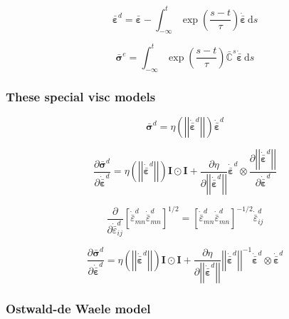 \documentclass[12pt]{article}
\renewcommand{\d}{\text{d}}
\newcommand{\pder}[2]{\dfrac{\partial #1}{\partial #2}}
\begin{document}
\begin{equation}
\bar{\bm{\varepsilon}}^{d} = \bar{\bm{\varepsilon}} - \int_{-\infty}^{t} \exp\left(\dfrac{s-t}{\tau}\right)\dot{\bar{\bm{\varepsilon}}} \,\d s
\end{equation}

\begin{equation}
\bar{\bm{\sigma}}^{e} = \int_{-\infty}^{t} \exp\left(\dfrac{s-t}{\tau}\right)\bar{\mathbb{C}}^{s}\dot{\bar{\bm{\varepsilon}}} \,\d s
\end{equation}

\subsubsection{These special visc models}

\begin{equation}
	\bar{\bm{\sigma}}^{d} = \eta\left(\left|\left|\dot{\bar{\bm{\varepsilon}}}^{d}\right| \right|\right)\dot{\bar{\bm{\varepsilon}}}^{d}
\end{equation}

\begin{equation}
	\pder{\bar{\bm{\sigma}}^{d}}{\dot{\bar{\bm{\varepsilon}}}^{d}}= \eta\left(\left|\left|\dot{\bar{\bm{\varepsilon}}}^{d}\right| \right|\right) \bm{I}\odot\bm{I} +\pder{\eta}{\left|\left|\dot{\bar{\bm{\varepsilon}}}^{d}\right| \right|} \dot{\bar{\bm{\varepsilon}}}^{d} \otimes \pder{\left|\left|\dot{\bar{\bm{\varepsilon}}}^{d}\right| \right|}{\dot{\bar{\bm{\varepsilon}}}^{d} }
\end{equation}

\begin{equation}
	\pder{}{\dot{\bar{\varepsilon}}^{d}_{ij}}\left[\dot{\bar{\varepsilon}}^{d}_{mn}\dot{\bar{\varepsilon}}^{d}_{mn}\right]^{1/2} = \left[\dot{\bar{\varepsilon}}^{d}_{mn}\dot{\bar{\varepsilon}}^{d}_{mn}\right]^{-1/2} \dot{\bar{\varepsilon}}^{d}_{ij}
\end{equation}


\begin{equation}
\pder{\bar{\bm{\sigma}}^{d}}{\dot{\bar{\bm{\varepsilon}}}^{d}}= \eta\left(\left|\left|\dot{\bar{\bm{\varepsilon}}}^{d}\right| \right|\right) \bm{I}\odot\bm{I} +\pder{\eta}{\left|\left|\dot{\bar{\bm{\varepsilon}}}^{d}\right| \right|} \left|\left|\dot{\bar{\bm{\varepsilon}}}^{d}\right| \right|^{-1}\dot{\bar{\bm{\varepsilon}}}^{d} \otimes \dot{\bar{\bm{\varepsilon}}}^{d}
\end{equation}

\subsubsection{Ostwald-de Waele model}
\end{document}
